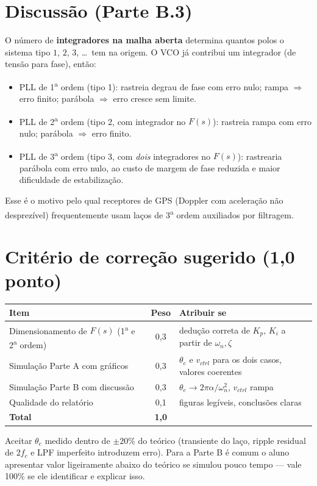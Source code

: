 \documentclass[11pt,a4paper]{article}
\begin{document}
\section{Discussão (Parte B.3)}

O número de \textbf{integradores na malha aberta} determina quantos polos o sistema tipo $1$, $2$,
$3$, \dots\ tem na origem. O VCO já contribui um integrador (de tensão para fase), então:
\begin{itemize}[leftmargin=1.5em]
  \item PLL de 1\textsuperscript{a} ordem (tipo 1): rastreia degrau de fase com erro nulo;
        rampa $\Rightarrow$ erro finito; parábola $\Rightarrow$ erro cresce sem limite.
  \item PLL de 2\textsuperscript{a} ordem (tipo 2, com integrador no $F(s)$): rastreia rampa com erro
        nulo; parábola $\Rightarrow$ erro finito.
  \item PLL de 3\textsuperscript{a} ordem (tipo 3, com \emph{dois} integradores no $F(s)$):
        rastrearia parábola com erro nulo, ao custo de margem de fase reduzida e maior dificuldade
        de estabilização.
\end{itemize}

Esse é o motivo pelo qual receptores de GPS (Doppler com aceleração não desprezível) frequentemente
usam laços de 3\textsuperscript{a} ordem auxiliados por filtragem.

\section{Critério de correção sugerido (1{,}0 ponto)}

\begin{center}
\begin{tabular}{lcl}
\toprule
\textbf{Item}                                              & \textbf{Peso} & \textbf{Atribuir se}\\
\midrule
Dimensionamento de $F(s)$ (1\textsuperscript{a} e 2\textsuperscript{a} ordem) & 0{,}3 & dedução correta de $K_p,\,K_i$ a partir de $\omega_n,\zeta$ \\
Simulação Parte A com gráficos                              & 0{,}3 & $\theta_e$ e $v_{ctrl}$ para os dois casos, valores coerentes \\
Simulação Parte B com discussão                             & 0{,}3 & $\theta_e\to 2\pi\alpha/\omega_n^2$, $v_{ctrl}$ rampa \\
Qualidade do relatório                                      & 0{,}1 & figuras legíveis, conclusões claras \\
\midrule
\textbf{Total}                                              & \textbf{1{,}0} & \\
\bottomrule
\end{tabular}
\end{center}

\begin{nota}[Tolerâncias]
Aceitar $\theta_e$ medido dentro de $\pm 20\%$ do teórico (transiente do laço, ripple residual
de $2f_c$ e LPF imperfeito introduzem erro). Para a Parte B é comum o aluno apresentar valor
ligeiramente abaixo do teórico se simulou pouco tempo --- vale 100\% se ele identificar e
explicar isso.
\end{nota}
\end{document}
